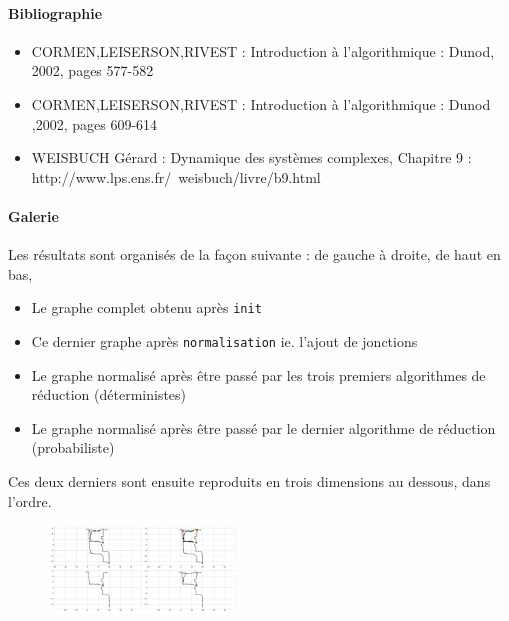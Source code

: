 \documentclass[french]{article}
\begin{document}
	\appendix

		\paragraph{Bibliographie}

			\begin{itemize}

				\item CORMEN,LEISERSON,RIVEST : Introduction à l'algorithmique : Dunod, 2002, pages 577-582

				\item CORMEN,LEISERSON,RIVEST : Introduction à l'algorithmique : Dunod ,2002, pages 609-614

				\item WEISBUCH Gérard : Dynamique des systèmes complexes, Chapitre 9 : http://www.lps.ens.fr/~weisbuch/livre/b9.html

			\end{itemize}

		\paragraph{Galerie}

			Les résultats sont organisés de la façon suivante : de gauche à droite, de haut en bas,
			\begin{itemize}
				\item Le graphe complet obtenu après \verb?init?
				\item Ce dernier graphe après \verb?normalisation? ie. l'ajout de jonctions
				\item Le graphe normalisé après être passé par les trois premiers algorithmes de réduction (déterministes)
				\item Le graphe normalisé après être passé par le dernier algorithme de réduction (probabiliste)
			\end{itemize}
			Ces deux derniers sont ensuite reproduits en trois dimensions au dessous, dans l'ordre.

			\newpage

			\begin{figure}[H]
				\includegraphics[width=5cm]{Pics/g11.png}
			\end{figure}
\end{document}
